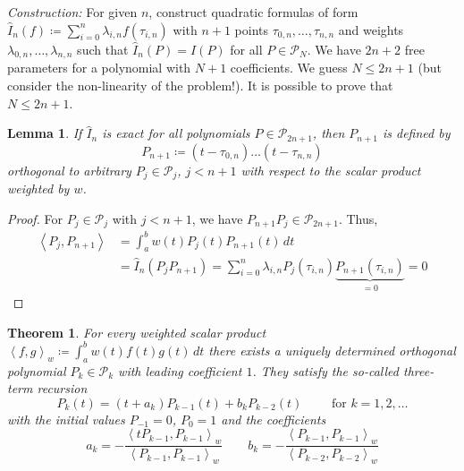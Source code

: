 \documentclass[a4paper]{article}
\newcounter{lecref}[section]
\numberwithin{lecref}{section}
\theoremstyle{break}
\newtheorem{thm}[lecref]{Theorem}
\newtheorem{lemma}[lecref]{Lemma}
\newcommand{\IP}[2]{\left\langle#1, #2\right\rangle}
\begin{document}
\emph{Construction:}
For given $n$, construct quadratic formulas of form $\hat{I}_n(f) \coloneqq \sum_{i=0}^n \lambda_{i,n} f(\tau_{i,n})$ with $n+1$ points $\tau_{0,n},\dots,\tau_{n,n}$ and weights $\lambda_{0,n}, \dots, \lambda_{n,n}$ such that $\hat{I}_n(P) = I(P)$ for all $P \in \mathcal P_N$.
We have $2n + 2$ free parameters for a polynomial with $N+1$ coefficients. We guess $N \leq 2n+1$ (but consider the non-linearity of the problem!). It is possible to prove that $N \leq 2n+1$.

\begin{lemma}
  \label{lemma:5-10}
  If $\hat{I}_n$ is exact for all polynomials $P \in \mathcal P_{2n+1}$, then $P_{n+1}$ is defined by \[ P_{n+1} \coloneqq (t - \tau_{0,n}) \dots (t - \tau_{n,n}) \]
  orthogonal to arbitrary $P_j \in \mathcal P_j$, $j < n + 1$ with respect to the scalar product weighted by $w$.
\end{lemma}

\begin{proof}
  For $P_j \in \mathcal P_j$ with $j < n+1$, we have $P_{n+1} P_j \in \mathcal P_{2n+1}$.
  Thus,
  \begin{align*}
    \IP{P_j}{P_{n+1}} &= \int_a^b w(t) P_j(t) P_{n+1}(t) \, dt \\
      &= \hat{I}_n(P_j P_{n+1}) = \sum_{i=0}^n \lambda_{i,n} P_j(\tau_{i,n}) \underbrace{P_{n+1}(\tau_{i,n})}_{=0} = 0
  \end{align*}
\end{proof}

\begin{thm}
  \label{theorem:5-11}
  For every weighted scalar product ${\IP fg}_w \coloneqq \int_a^b w(t) f(t) g(t) \, dt$ there exists a uniquely determined orthogonal polynomial $P_k \in \mathcal P_k$ with leading coefficient $1$. They satisfy the so-called \emph{three-term recursion}
  \[ P_k(t) = (t + a_k) P_{k-1}(t) + b_k P_{k-2}(t) \qquad \text{ for } k = 1,2,\dots \]
  with the initial values $P_{-1} = 0$, $P_0 = 1$ and the coefficients
  \[
    a_k = -\frac{\IP{t P_{k-1}}{P_{k-1}}_w}{\IP{P_{k-1}}{P_{k-1}}_w} \qquad
    b_k = -\frac{\IP{P_{k-1}}{P_{k-1}}_w}{\IP{P_{k-2}}{P_{k-2}}_w}
  \]
\end{thm}
\end{document}

